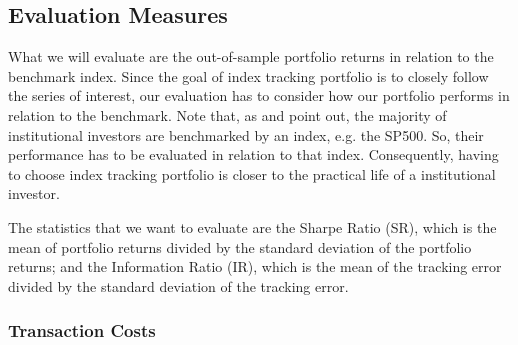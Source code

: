 \documentclass[preprint, doubleblind, authoryear,10pt]{elsarticle}
\begin{document}
\subsection{Evaluation Measures} %

What we will evaluate are the out-of-sample portfolio returns in relation to the benchmark index.
Since the goal of index tracking portfolio is to closely follow the series of interest, our evaluation has to consider how our portfolio performs in relation to the benchmark.
Note that, as \cite{tz2011} and \cite{liu-2009} point out, the majority of institutional investors are benchmarked by an index, e.g. the SP500.
So, their performance has to be evaluated in relation to that index.
Consequently, having to choose index tracking portfolio is closer to the practical life of a institutional investor.


The statistics that we want to evaluate are the Sharpe Ratio (SR), which is the mean of portfolio returns divided by the standard deviation of the portfolio returns; and the Information Ratio (IR), which is the mean of the tracking error divided by the standard deviation of the tracking error.


% 

\subsubsection*{Transaction Costs}
\end{document}
